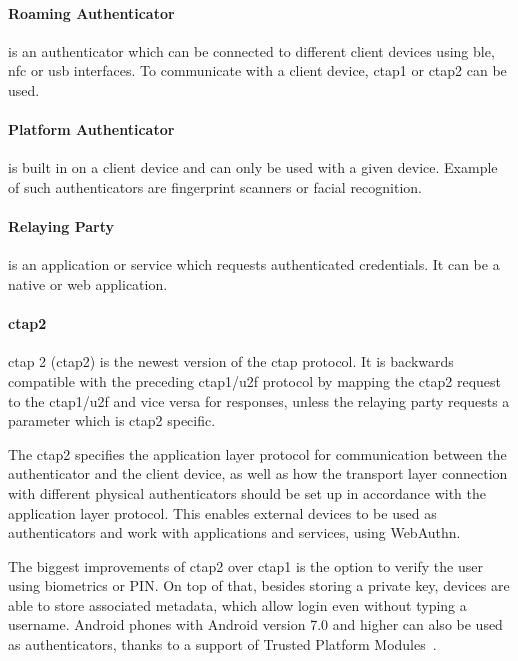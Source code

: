 \paragraph{Roaming Authenticator} 
is an authenticator which can be connected to different client devices using \acrshort{ble}, \acrshort{nfc} or \acrshort{usb} interfaces. To communicate with a client device, \acrshort{ctap}1 or \acrshort{ctap}2 can be used.

\paragraph{Platform Authenticator} 
is built in on a client device and can only be used with a given device. Example of such authenticators are fingerprint scanners or facial recognition.

\paragraph{Relaying Party} 
is an application or service which requests authenticated credentials. It can be a native or web application.

\paragraph{\acrshort{ctap}2}
\acrlong{ctap} 2 (\acrshort{ctap}2) is the newest version of the \acrshort{ctap} protocol. It is backwards compatible with the preceding \acrshort{ctap}1/\acrshort{u2f} protocol by mapping the \acrshort{ctap}2 request to the \acrshort{ctap}1/\acrshort{u2f} and vice versa for responses, unless the relaying party requests a parameter which is \acrshort{ctap}2 specific. 

The \acrshort{ctap}2 specifies the application layer protocol for communication between the authenticator and the client device, as well as how the transport layer connection with different physical authenticators should be set up in accordance with the application layer protocol. This enables external devices to be used as authenticators and work with applications and services, using WebAuthn.

The biggest improvements of \acrshort{ctap}2 over \acrshort{ctap}1 is the option to verify the user using biometrics or PIN. On top of that, besides storing a private key, devices are able to store associated metadata, which allow login even without typing a username. Android phones with Android version 7.0 and higher can also be used as authenticators, thanks to a support of Trusted Platform Modules~\cite{FIDOAlliance2019News:Key}.


